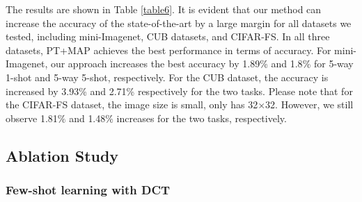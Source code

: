 \documentclass[10pt, conference, compsocconf]{IEEEtran}
\begin{document}
The results are shown in Table \ref{table6}. It is evident that our method can increase the accuracy of the state-of-the-art by a large margin for all datasets we tested, including mini-Imagenet, CUB datasets, and CIFAR-FS. In all three datasets, PT+MAP achieves the best performance in terms of accuracy. For mini-Imagenet, our approach increases the best accuracy by {}{1.89}\% and {}{1.8}\% for 5-way 1-shot and 5-way 5-shot, respectively. For the CUB dataset, the accuracy is increased by {}{3.93}\% and 2.71\% respectively for the two tasks. Please note that for the CIFAR-FS dataset, the image size is small, only has 32$\times$32. However, we still observe {}{1.81}$\%$ and {}{1.48}$\%$ increases for the two tasks, respectively. 

\begin{comment}
The results are shown in Table \ref{table6}. It is evident that our method can increase the accuracy of the state-of-the-art for all datasets we tested, including mini-Imagenet, CUB datasets and CIFAR-FS. , and achieve a new state-of-the-art, 85.01$\pm$0.22 for 5-way 1-shot and 90.72$\pm$0.11 for 5-way 5-shot on miniImagenet, 95.45$\pm$0.13 for 5-way 1-shot and 96.70$\pm$0.07 for 5-way 5-shot on CUB, and 89.39$\pm$0.21 for 5-way 1-shot and 92.08$\pm$0.15 for 5-way 5-shot on CIFAR-FS. One interesting observation on CIFAR-FS is that, the accuracy increased by 1.7$\%$ and 1.4$\%$ for 5-way 1-shot and 5-way 5-shot tasks respectively, which are less than improvement on miniImageNet and CUB. The reason might be images in CIFAR-FS are smaller, only 32$\times$32, and the spatial version uses 32$\times$32 as its input size. So no additional information could be included in frequency version, which is different from miniImageNet and CUB when we uses 84$\times$84 or 224$\times$224 as the input size for spatial version, while the original images are larger than that. This result also concedes with conclusion in table \ref{table2}. Another reason for this might be the frequency branch will resize the original 32$\times$ 32 images in CIFAR-FS dataset to 448$\times$448 and the upsampling effect decreases greatly.
\end{comment}

\subsection{Ablation Study}

\subsubsection{Few-shot learning with DCT}
\end{document}
